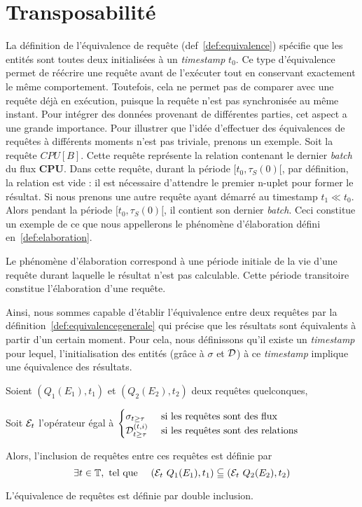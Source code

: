 \section{Transposabilité}\label{sec:contrib:astral:transposabilite}
La définition de l'équivalence de requête (def~\ref{def:equivalence}) spécifie que les entités sont toutes deux initialisées à un \textit{timestamp} $t_0$. Ce type d'équivalence permet de réécrire une requête avant de l'exécuter tout en conservant exactement le même comportement. Toutefois, cela ne permet pas de comparer avec une requête déjà en exécution, puisque la requête n'est pas synchronisée au même instant. Pour intégrer des données provenant de différentes parties, cet aspect a une grande importance.
Pour illustrer que l'idée d'effectuer des équivalences de requêtes à différents moments n'est pas triviale, prenons un exemple. Soit la requête $CPU[B]$. Cette requête représente la relation contenant le dernier \textit{batch} du flux \textbf{CPU}. Dans cette requête, durant la période $[t_0,\tau_S(0)[$, par définition, la relation est vide : il est nécessaire d'attendre le premier n-uplet pour former le résultat. Si nous prenons une autre requête ayant démarré au timestamp $t_1 \ll t_0$. Alors pendant la période $[t_0,\tau_S(0)[$, il contient son dernier \textit{batch}. Ceci constitue un exemple de ce que nous appellerons le phénomène d'élaboration défini en~\ref{def:elaboration}.
\begin{defi}\label{def:elaboration}
    Le phénomène d'élaboration correspond à une période initiale de la vie d'une requête durant laquelle le résultat n'est pas calculable. Cette période transitoire constitue l'élaboration d'une requête.
\end{defi}

Ainsi, nous sommes capable d'établir l'équivalence entre deux requêtes par la définition~\ref{def:equivalencegenerale} qui précise que les résultats sont équivalents à partir d'un certain moment. Pour cela, nous définissons qu'il existe un \textit{timestamp} pour lequel, l'initialisation des entités (grâce à $\sigma$ et $\mathcal{D}$) à ce \textit{timestamp} implique une équivalence des résultats.
\begin{defi}\label{def:equivalencegenerale}
    Soient $(Q_1(E_1),t_1)$ et $(Q_2(E_2),t_2)$ deux requêtes quelconques,

    Soit $\mathcal{E}_t$ l'opérateur égal à $\begin{cases} \sigma_{t\geq \tau} & \textrm{ si les requêtes sont des flux}\\ \mathcal{D}_{t\geq \tau}^{(t,i)} & \textrm{  si les requêtes sont des relations}\end{cases}$

    Alors, l'inclusion de requêtes entre ces requêtes est définie par $$\exists t \in \mathbb{T}, \textrm{ tel que } \quad (\mathcal{E}_t\ Q_1(E_1), t_1) \subseteqq (\mathcal{E}_t\  Q_2(E_2), t_2)$$

    L'équivalence de requêtes est définie par double inclusion.
\end{defi}

